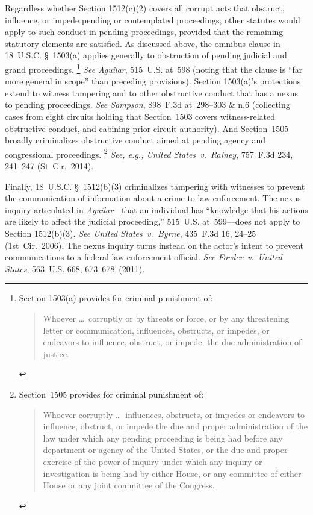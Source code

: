 Regardless whether Section 1512(c)(2) covers all corrupt acts that obstruct, influence, or impede pending or contemplated proceedings, other statutes would apply to such conduct in pending proceedings, provided that the remaining statutory elements are satisfied.
As discussed above, the omnibus clause in 18~U.S.C. \S~1503(a) applies generally to obstruction of pending judicial and grand proceedings.%
\footnote{Section 1503(a) provides for criminal punishment of:
\begin{quote}
Whoever \dots\ corruptly or by threats or force, or by any threatening letter or communication, influences, obstructs, or impedes, or endeavors to influence, obstruct, or impede, the due administration of justice.
\end{quote}}
\textit{See Aguilar}, 515~U.S. at~598 (noting that the clause is ``far more general in scope'' than preceding provisions).
Section 1503(a)'s protections extend to witness tampering and to other obstructive conduct that has a nexus to pending proceedings.
\textit{See Sampson}, 898~F.3d at~298--303 \& n.6 (collecting cases from eight circuits holding that Section~1503 covers witness-related obstructive conduct, and cabining prior circuit authority).
And Section~1505 broadly criminalizes obstructive conduct aimed at pending agency and congressional proceedings.%
\footnote{Section~1505 provides for criminal punishment of:
\begin{quote}
Whoever corruptly \dots\ influences, obstructs, or impedes or endeavors to influence, obstruct, or impede the due and proper administration of the law under which any pending proceeding is being had before any department or agency of the United States, or the due and proper exercise of the power of inquiry under which any inquiry or investigation is being had by either House, or any committee of either House or any joint committee of the Congress.
\end{quote}}
\textit{See, e.g., United States~v.\ Rainey}, 757~F.3d 234, 241--247 (St~Cir.~2014).

Finally, 18~U.S.C. \S~1512(b)(3) criminalizes tampering with witnesses to prevent the communication of information about a crime to law enforcement.
The nexus inquiry articulated in \textit{Aguilar}---that an individual has ``knowledge that his actions are likely to affect the judicial proceeding,'' 515~U.S. at~599---does not apply to Section 1512(b)(3).
\textit{See United States~v.\ Byrne}, 435~F.3d 16, 24--25 (1st~Cir.~2006).
The nexus inquiry turns instead on the actor's intent to prevent communications to a federal law enforcement official.
\textit{See Fowler~v.\ United States}, 563~U.S. 668, 673--678~(2011).

